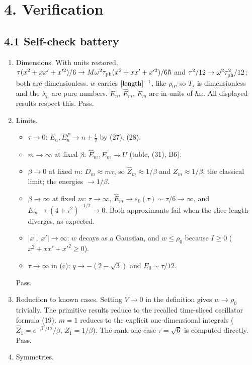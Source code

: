 \documentclass[11pt,a4paper]{article}
\providecommand{\tightlist}{\setlength{\itemsep}{0pt}\setlength{\parskip}{0pt}}
\begin{document}
\hypertarget{verification}{%
\section{4. Verification}\label{verification}}

\hypertarget{self-check-battery}{%
\subsection{4.1 Self-check battery}\label{self-check-battery}}

\begin{enumerate}
\def\labelenumi{\arabic{enumi}.}
\tightlist
\item
  Dimensions. With units restored,
  \(\tau(x^2+xx'+x'^2)/6\to M\omega^2\tau_{\rm ph}(x^2+xx'+x'^2)/6\hbar\)
  and \(\tau^2/12\to\omega^2\tau_{\rm ph}^2/12\); both are
  dimensionless. \(w\) carries \([{\rm length}]^{-1}\), like \(\rho_0\),
  so \(T_\tau\) is dimensionless and the \(\lambda_n\) are pure numbers.
  \(E_n\), \(\hat E_m\), \(E_m\) are in units of \(\hbar\omega\). All
  displayed results respect this. Pass.
\item
  Limits.

  \begin{itemize}
  \tightlist
  \item
    \(\tau\to0\): \(E_n,E^P_n\to n+\tfrac12\) by (27), (28).
  \item
    \(m\to\infty\) at fixed \(\beta\): \(\hat E_m,E_m\to U\) (table,
    (31), B6).
  \item
    \(\beta\to0\) at fixed \(m\): \(D_m\approx m\tau\), so
    \(\hat Z_m\approx1/\beta\) and \(Z_m\approx 1/\beta\), the classical
    limit; the energies \(\to1/\beta\).
  \item
    \(\beta\to\infty\) at fixed \(m\): \(\tau\to\infty\),
    \(\hat E_m\to\varepsilon_0(\tau)\sim\tau/6\to\infty\), and
    \(E_m\to(4+\tau^2)^{-1/2}\to0\). Both approximants fail when the
    slice length diverges, as expected.
  \item
    \(|x|,|x'|\to\infty\): \(w\) decays as a Gaussian, and
    \(w\le\rho_0\) because \(I\ge0\) (\(x^2+xx'+x'^2\ge0\)).
  \item
    \(\tau\to\infty\) in (c): \(q\to-(2-\sqrt3)\) and
    \(E_0\sim\tau/12\).
  \end{itemize}

  Pass.
\item
  Reduction to known cases. Setting \(V\to0\) in the definition gives
  \(w\to\rho_0\) trivially. The primitive results reduce to the recalled
  time-sliced oscillator formula (19). \(m=1\) reduces to the explicit
  one-dimensional integrals (\(\hat Z_1 = e^{-\beta^2/12}/\beta\),
  \(Z_1 = 1/\beta\)). The rank-one case \(\tau=\sqrt6\) is computed
  directly. Pass.
\item
  Symmetries.


\end{enumerate}
\end{document}
